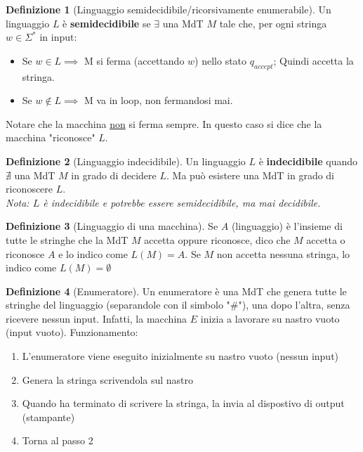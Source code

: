 \documentclass{article}  %
\theoremstyle{definition}
\newtheorem{definition}{Definizione}[section]
\begin{document}
\begin{definition}[Linguaggio semidecidibile/ricorsivamente enumerabile]
    Un linguaggio $L$ è \textbf{semidecidibile} se $\exists$ una MdT $M$ tale che, per ogni stringa $w\in \Sigma^*$ in input:
  \begin{itemize}
    \item Se $w \in L \implies$ M si ferma (accettando $w$) nello stato $q_{accept}$; Quindi accetta la stringa.
    \item Se $w \notin L \implies$ M va in loop, non fermandosi mai.
  \end{itemize}
Notare che la macchina \underline{non} si ferma sempre. In questo caso si dice che la macchina "riconosce" $L$.
\end{definition}

\begin{definition}[Linguaggio indecidibile]
    Un linguaggio $L$ è \textbf{indecidibile} quando $\nexists$ una MdT $M$ in grado di decidere $L$. Ma può esistere una MdT in grado
    di riconoscere $L$.\\
    \textit{Nota: $L$ è indecidibile e potrebbe essere semidecidibile, ma mai decidibile.}
\end{definition}

\begin{definition}[Linguaggio di una macchina] 
  Se $A$ (linguaggio) è l'insieme di tutte le stringhe che la MdT $M$ accetta oppure riconosce, dico che $M$ accetta o riconosce $A$ e lo indico come $L(M)=A$. \newline
  Se $M$ non accetta nessuna stringa, lo indico come $L(M)=\emptyset$
\end{definition}

\begin{definition}[Enumeratore]
  Un enumeratore è una MdT che genera tutte le stringhe del linguaggio (separandole con il simbolo "$\#$"), 
  una dopo l'altra, senza ricevere nessun input. Infatti, la macchina $E$ inizia a lavorare su nastro vuoto (input vuoto). \newline \newline
  Funzionamento:
  \begin{enumerate}
    \item L'enumeratore viene eseguito inizialmente su nastro vuoto (nessun input)
    \item Genera la stringa scrivendola sul nastro
    \item Quando ha terminato di scrivere la stringa, la invia al dispostivo di output (stampante)
    \item Torna al passo 2
  \end{enumerate}
  
\end{definition}
\break
\end{document}
